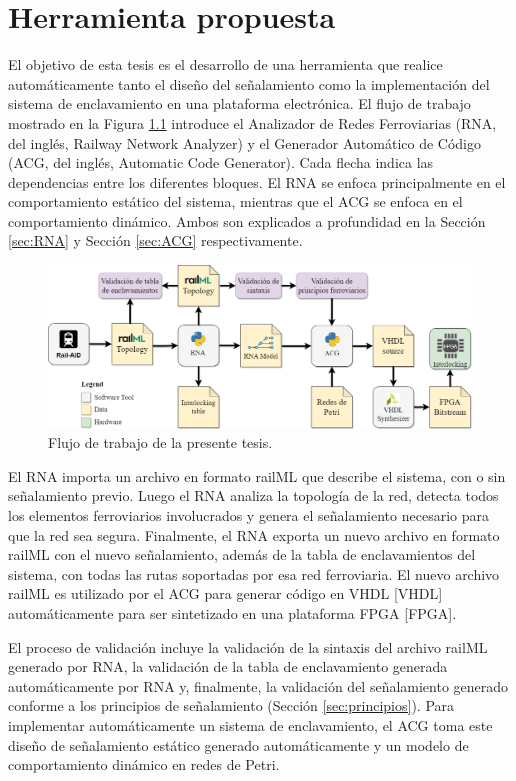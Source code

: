 \chapter{Herramienta propuesta}

    El objetivo de esta tesis es el desarrollo de una herramienta que realice automáticamente tanto el diseño del señalamiento como la implementación del sistema de enclavamiento en una plataforma electrónica. El flujo de trabajo mostrado en la Figura \ref{fig:workflow} introduce el Analizador de Redes Ferroviarias (RNA, del inglés, Railway Network Analyzer) y el Generador Automático de Código (ACG, del inglés, Automatic Code Generator). Cada flecha indica las dependencias entre los diferentes bloques. El RNA se enfoca principalmente en el comportamiento estático del sistema, mientras que el ACG se enfoca en el comportamiento dinámico. Ambos son explicados a profundidad en la Sección \ref{sec:RNA} y Sección \ref{sec:ACG} respectivamente.

    \begin{figure}[h]
        \centering
        \includegraphics[width=1\textwidth]{Figuras/workflow.png}
        \centering\caption{Flujo de trabajo de la presente tesis.}
        \label{fig:workflow}
    \end{figure}

    El RNA importa un archivo en formato railML que describe el sistema, con o sin señalamiento previo. Luego el RNA analiza la topología de la red, detecta todos los elementos ferroviarios involucrados y genera el señalamiento necesario para que la red sea segura. Finalmente, el RNA exporta un nuevo archivo en formato railML con el nuevo señalamiento, además de la tabla de enclavamientos del sistema, con todas las rutas soportadas por esa red ferroviaria. El nuevo archivo railML es utilizado por el ACG para generar código en VHDL [VHDL] automáticamente para ser sintetizado en una plataforma FPGA [FPGA].
    
    El proceso de validación incluye la validación de la sintaxis del archivo railML generado por RNA, la validación de la tabla de enclavamiento generada automáticamente por RNA y, finalmente, la validación del señalamiento generado conforme a los principios de señalamiento (Sección \ref{sec:principios}). Para implementar automáticamente un sistema de enclavamiento, el ACG toma este diseño de señalamiento estático generado automáticamente y un modelo de comportamiento dinámico en redes de Petri. %
    





